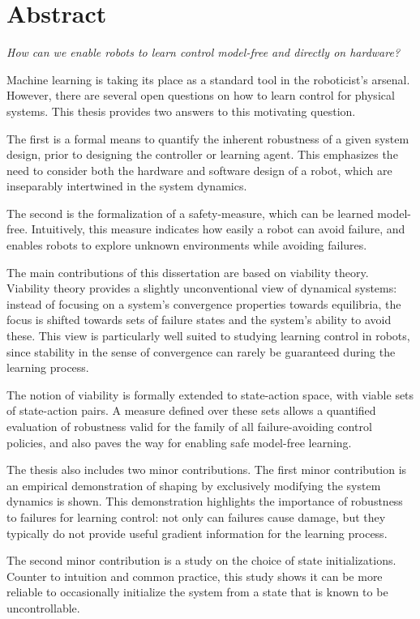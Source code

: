 
\chapter*{Abstract}
\emph{How can we enable robots to learn control model-free and directly on hardware?} \par
Machine learning is taking its place as a standard tool in the roboticist's arsenal. However, there are several open questions on how to learn control for physical systems. This thesis provides two answers to this motivating question. \par
The first is a formal means to quantify the inherent robustness of a given system design, prior to designing the controller or learning agent. This emphasizes the need to consider both the hardware and software design of a robot, which are inseparably intertwined in the system dynamics. \par
The second is the formalization of a safety-measure, which can be learned model-free. Intuitively, this measure indicates how easily a robot can avoid failure, and enables robots to explore unknown environments while avoiding failures. \par
The main contributions of this dissertation are based on viability theory. Viability theory provides a slightly unconventional view of dynamical systems: instead of focusing on a system's convergence properties towards equilibria, the focus is shifted towards sets of failure states and the system's ability to avoid these. This view is particularly well suited to studying learning control in robots, since stability in the sense of convergence can rarely be guaranteed during the learning process. \par
The notion of viability is formally extended to state-action space, with viable sets of state-action pairs. A measure defined over these sets allows a quantified evaluation of robustness valid for the family of all failure-avoiding control policies, and also paves the way for enabling safe model-free learning. \par
The thesis also includes two minor contributions. The first minor contribution is an empirical demonstration of shaping by exclusively modifying the system dynamics is shown. This demonstration highlights the importance of robustness to failures for learning control: not only can failures cause damage, but they typically do not provide useful gradient information for the learning process. \par
The second minor contribution is a study on the choice of state initializations. Counter to intuition and common practice, this study shows it can be more reliable to occasionally initialize the system from a state that is known to be uncontrollable. 